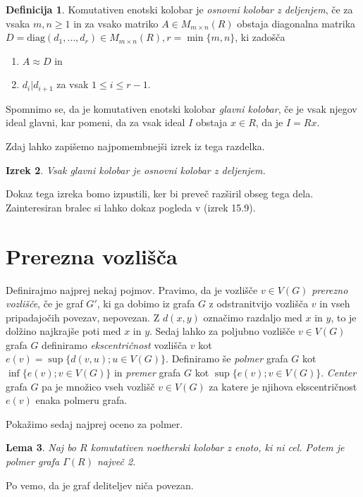 \documentclass[a4paper, 12pt]{amsart}
\theoremstyle{definition} %
\newtheorem{definicija}{Definicija}[section]
\theoremstyle{plain} %
\newtheorem{lema}[definicija]{Lema}
\newtheorem{izrek}[definicija]{Izrek}
\begin{document}
\begin{definicija}
Komutativen enotski kolobar je \emph{osnovni kolobar z deljenjem}, če za vsaka $m,n\ge 1$ in za vsako matriko $A\in M_{m\times n}(R)$ obstaja diagonalna matrika $D= \textrm{diag}(d_1,\dots,d_r) \in M_{m\times n} (R), r = \min\{m,n\}$, ki zadošča
\begin{enumerate}
\item $A\approx D$ in
\item $d_i | d_{i+1}$ za vsak $1 \le i \le r-1$.
\end{enumerate} 
\end{definicija}
Spomnimo se, da je komutativen enotski kolobar \emph{glavni kolobar}, če je vsak njegov ideal glavni, kar pomeni, da za vsak ideal $I$ obstaja $x\in R$, da je $I=Rx$. 

Zdaj lahko zapišemo najpomembnejši izrek iz tega razdelka.
\begin{izrek}
\label{PIR-elementaryDivisionRing}
Vsak glavni kolobar je osnovni kolobar z deljenjem.
\end{izrek}
Dokaz tega izreka bomo izpustili, ker bi preveč razširil obseg tega dela. Zainteresiran bralec si lahko dokaz pogleda v \cite{Brown} (izrek 15.9).

\section{Prerezna vozlišča}
Definirajmo najprej nekaj pojmov. Pravimo, da je vozlišče $v\in V(G)$ \emph{prerezno vozlišče}, če je graf $G'$, ki ga dobimo iz grafa $G$ z odstranitvijo vozlišča $v$ in vseh pripadajočih povezav, nepovezan. Z $d(x,y)$ označimo razdaljo med $x$ in $y$, to je dolžino najkrajše poti med $x$ in $y$. Sedaj lahko za poljubno vozlišče $v \in V(G)$ grafa $G$ definiramo \emph{ekscentričnost} vozlišča $v$ kot $e(v) = \sup\{d(v,u);u\in V(G)\}$. Definiramo še \emph{polmer} grafa $G$ kot $\inf\{e(v); v\in V(G)\}$ in \emph{premer} grafa $G$ kot $\sup\{ e(v); v\in V(G)\}$.  \emph{Center} grafa $G$ pa je množico vseh vozlišč $v\in V(G)$ za katere je njihova ekscentričnost $e(v)$ enaka polmeru grafa.

Pokažimo sedaj najprej oceno za polmer.

\begin{lema}
\label{radij}
Naj bo $R$ komutativen noetherski kolobar z enoto, ki ni cel. Potem je polmer grafa $\Gamma(R)$ največ 2.
\end{lema}

\proof
Po \cite{diploma} vemo, da je graf deliteljev niča povezan.
\end{document}
